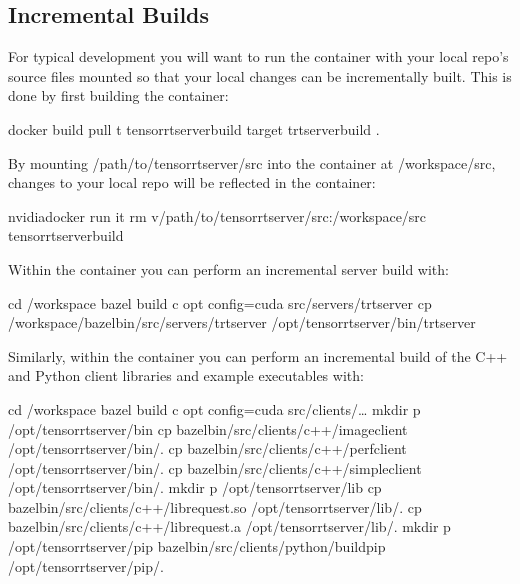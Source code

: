 \documentclass[letterpaper,10pt,english]{sphinxmanual}
\begin{document}
\subsection{Incremental Builds}
\label{\detokenize{build:incremental-builds}}
For typical development you will want to run the  container
with your local repo’s source files mounted so that your local changes
can be incrementally built. This is done by first building the
 container:

\begin{sphinxVerbatim}[commandchars=\\\{\}]
\PYGZdl{} docker build \PYGZhy{}\PYGZhy{}pull \PYGZhy{}t tensorrtserver\PYGZus{}build \PYGZhy{}\PYGZhy{}target trtserver\PYGZus{}build .
\end{sphinxVerbatim}

By mounting /path/to/tensorrtserver/src into the container at
/workspace/src, changes to your local repo will be reflected in the
container:

\begin{sphinxVerbatim}[commandchars=\\\{\}]
\PYGZdl{} nvidia\PYGZhy{}docker run \PYGZhy{}it \PYGZhy{}\PYGZhy{}rm \PYGZhy{}v/path/to/tensorrtserver/src:/workspace/src tensorrtserver\PYGZus{}build
\end{sphinxVerbatim}

Within the container you can perform an incremental server build
with:

\begin{sphinxVerbatim}[commandchars=\\\{\}]
\PYGZsh{} cd /workspace
\PYGZsh{} bazel build \PYGZhy{}c opt \PYGZhy{}\PYGZhy{}config=cuda src/servers/trtserver
\PYGZsh{} cp /workspace/bazel\PYGZhy{}bin/src/servers/trtserver /opt/tensorrtserver/bin/trtserver
\end{sphinxVerbatim}

Similarly, within the container you can perform an incremental build
of the C++ and Python client libraries and example executables with:

\begin{sphinxVerbatim}[commandchars=\\\{\}]
\PYGZsh{} cd /workspace
\PYGZsh{} bazel build \PYGZhy{}c opt \PYGZhy{}\PYGZhy{}config=cuda src/clients/…
\PYGZsh{} mkdir \PYGZhy{}p /opt/tensorrtserver/bin
\PYGZsh{} cp bazel\PYGZhy{}bin/src/clients/c++/image\PYGZus{}client /opt/tensorrtserver/bin/.
\PYGZsh{} cp bazel\PYGZhy{}bin/src/clients/c++/perf\PYGZus{}client /opt/tensorrtserver/bin/.
\PYGZsh{} cp bazel\PYGZhy{}bin/src/clients/c++/simple\PYGZus{}client /opt/tensorrtserver/bin/.
\PYGZsh{} mkdir \PYGZhy{}p /opt/tensorrtserver/lib
\PYGZsh{} cp bazel\PYGZhy{}bin/src/clients/c++/librequest.so /opt/tensorrtserver/lib/.
\PYGZsh{} cp bazel\PYGZhy{}bin/src/clients/c++/librequest.a /opt/tensorrtserver/lib/.
\PYGZsh{} mkdir \PYGZhy{}p /opt/tensorrtserver/pip
\PYGZsh{} bazel\PYGZhy{}bin/src/clients/python/build\PYGZus{}pip /opt/tensorrtserver/pip/.
\end{sphinxVerbatim}
\end{document}
